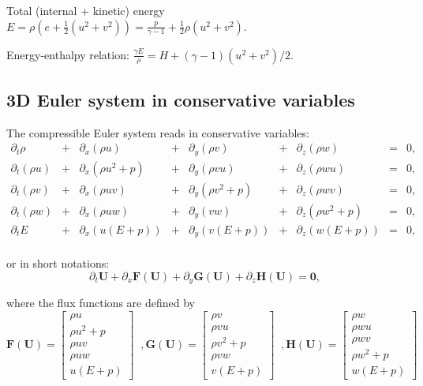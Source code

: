 \documentclass{article}
\begin{document}
Total (internal + kinetic) energy $E = \rho \left( e + \frac{1}{2} (u^2+v^2) \right) = \frac{p}{\gamma-1} + \frac{1}{2} \rho (u^2+v^2)$.

Energy-enthalpy relation: $\frac{\gamma E}{\rho}=H+(\gamma-1)(u^2+v^2)/2$.

\subsection*{3D Euler system in conservative variables}
The compressible Euler system reads in conservative variables:\\
\begin{equation}
  \begin{array}{ccccccccc}
    \partial_t \rho & + & \partial_x(\rho u) & + & \partial_y(\rho v) & + & \partial_z(\rho w) & = & 0,\\
    \partial_t (\rho u) & + & \partial_x(\rho u^2+p) & + & \partial_y(\rho v u) & + & \partial_z(\rho w u) & = & 0,\\
    \partial_t (\rho v) & + & \partial_x(\rho u v) & + & \partial_y(\rho v^2+p) & + & \partial_z(\rho w v) & = & 0,\\
    \partial_t (\rho w) & + & \partial_x(\rho u w) & + & \partial_y(v w) & + & \partial_z(\rho w^2+p) & = & 0,\\
    \partial_t E & + & \partial_x (u(E+p)) & + & \partial_y (v(E+p)) & + & \partial_z (w(E+p)) & = & 0,\\
  \end{array}
\end{equation}

or in short notations:
\begin{equation*}
  \partial_t \mathbf{U} + \partial_x \mathbf{F(U)} + \partial_y \mathbf{G(U)} + \partial_z \mathbf{H(U)} = \mathbf{0},
\end{equation*}

where the flux functions are defined by
\begin{equation}
  \mathbf{F(U)} = \left [
  \begin{array}{c}
    \rho u \\
    \rho u^2 + p \\
    \rho u v \\
    \rho u w \\
    u (E + p)
  \end{array} \right]
  \;\; ,
  \mathbf{G(U)} = \left [
  \begin{array}{c}
    \rho v \\
    \rho v u \\
    \rho v^2 + p \\
    \rho v w \\
    v (E + p)
  \end{array} \right]
  \;\; ,
  \mathbf{H(U)} = \left [
  \begin{array}{c}
    \rho w \\
    \rho w u \\
    \rho w v \\
    \rho w^2 + p \\
    w (E + p)
  \end{array} \right]
\end{equation}
\end{document}
